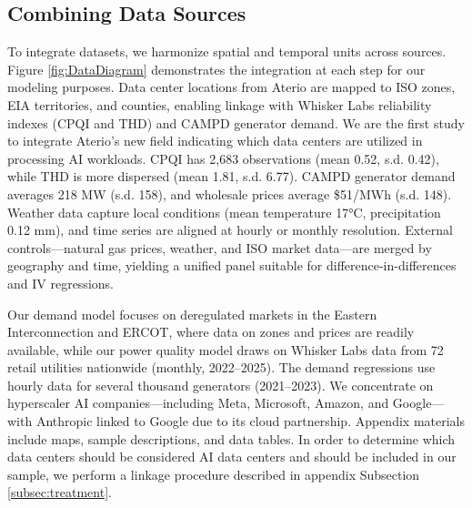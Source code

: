 \documentclass[sigconf]{acmart}
\begin{document}
\subsection{Combining Data Sources}

To integrate datasets, we harmonize spatial and temporal units across sources. Figure \ref{fig:DataDiagram} demonstrates the integration at each step for our modeling purposes. Data center locations from Aterio are mapped to ISO zones, EIA territories, and counties, enabling linkage with Whisker Labs reliability indexes (CPQI and THD) and CAMPD generator demand. We are the first study to integrate Aterio’s new field indicating which data centers are utilized in processing AI workloads. CPQI has 2,683 observations (mean 0.52, s.d. 0.42), while THD is more dispersed (mean 1.81, s.d. 6.77). CAMPD generator demand averages 218 MW (s.d. 158), and wholesale prices average \$51/MWh (s.d. 148). Weather data capture local conditions (mean temperature 17°C, precipitation 0.12 mm), and time series are aligned at hourly or monthly resolution. External controls—natural gas prices, weather, and ISO market data—are merged by geography and time, yielding a unified panel suitable for difference-in-differences and IV regressions.

Our demand model focuses on deregulated markets in the Eastern Interconnection and ERCOT, where data on zones and prices are readily available, while our power quality model draws on Whisker Labs data from 72 retail utilities nationwide (monthly, 2022–2025). The demand regressions use hourly data for several thousand generators (2021–2023). We concentrate on hyperscaler AI companies—including Meta, Microsoft, Amazon, and Google—with Anthropic linked to Google due to its cloud partnership. Appendix materials include maps, sample descriptions, and data tables. In order to determine which data centers should be considered AI data centers and should be included in our sample, we perform a linkage procedure described in appendix Subsection \ref{subsec:treatment}.
\end{document}
